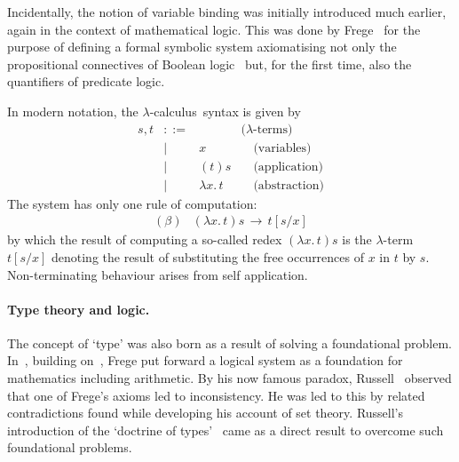 \documentclass[11pt,twocolumn]{article}
\newcommand{\lcalculus}{\mbox{$\lambda$-calculus}}
\begin{document}
Incidentally, the notion of variable binding was initially introduced much
earlier, again in the context of mathematical logic.  This was done by
Frege~\cite{Frege1879} for the purpose of defining a formal symbolic
system axiomatising not only the propositional connectives of Boolean
logic~\cite{Boole} but, for the first time, also the quantifiers of
predicate logic.

In modern notation, the \lcalculus\ syntax is given by
  \[\begin{array}{rcll}
    s , t & ::= & & \mbox{($\lambda$-terms)}\\
      & \mid & x & \quad\mbox{(variables)}\\
      & \mid & (t)s & \quad\mbox{(application)}\\
      & \mid & \lambda x.\,t & \quad\mbox{(abstraction)}
  \end{array}\]
The system has only one rule of computation:
  \begin{equation}\label{BetaReduction}\begin{array}{rl}
(\beta) & (\lambda x.\,t)s \,\longrightarrow\, t[s/x]
  \end{array}\end{equation}
by which the result of computing a so-called redex $(\lambda x.\,t)s$ is
the \mbox{$\lambda$-term} $t[s/x]$ denoting the result of substituting the
free occurrences of $x$ in $t$ by $s$.  Non-terminating behaviour arises from
self application.

\paragraph{Type theory and logic.}
\label{SectionATypeTheoryAndLogicParagraph}

The concept of `type' was also born as a result of solving a foundational
problem.  In~\cite{Frege1903}, building on~\cite{Frege1879}, Frege put
forward a logical system as a foundation for mathematics including
arithmetic.  By his now famous paradox, Russell~\cite{Russell1902}
observed that one of Frege's axioms led to inconsistency.  He was led to
this by related contradictions found while developing his account of set
theory.  Russell's introduction of the `doctrine of
types'~\cite[Appendix~B]{Russell1903} came as a direct result to overcome
such foundational problems.
\end{document}
